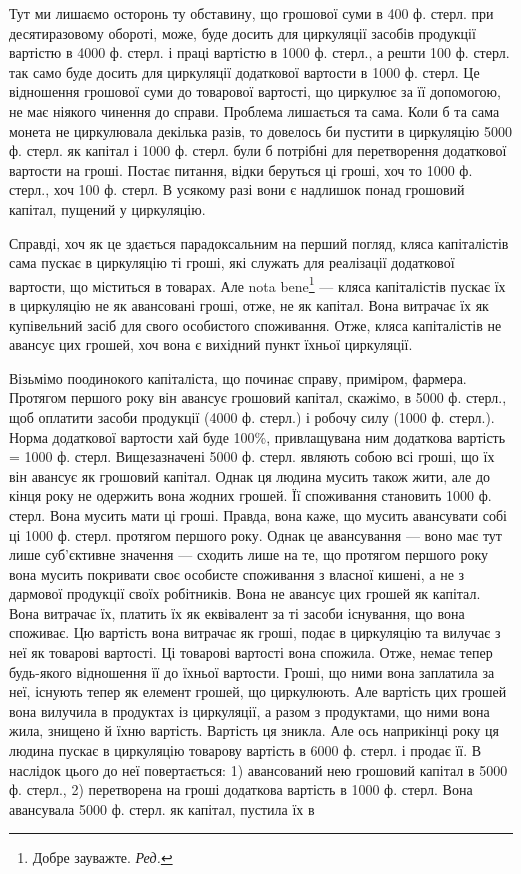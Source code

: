 Тут ми лишаємо осторонь ту обставину, що грошової суми в 400
ф. стерл. при десятиразовому обороті, може, буде досить для циркуляції
засобів продукції вартістю в 4000 ф. стерл. і праці вартістю в 1000 ф.
стерл., а решти 100 ф. стерл. так само буде досить для циркуляції додаткової
вартости в 1000 ф. стерл. Це відношення грошової суми до товарової
вартості, що циркулює за її допомогою, не має ніякого чинення до
справи. Проблема лишається та сама. Коли б та сама монета не циркулювала
декілька разів, то довелось би пустити в циркуляцію 5000 ф. стерл.
як капітал і 1000 ф. стерл. були б потрібні для перетворення додаткової
вартости на гроші. Постає питання, відки беруться ці гроші, хоч то
1000 ф. стерл., хоч 100 ф. стерл. В усякому разі вони є надлишок понад
грошовий капітал, пущений у циркуляцію.

Справді, хоч як це здається парадоксальним на перший погляд, кляса
капіталістів сама пускає в циркуляцію ті гроші, які служать для реалізації
додаткової вартости, що міститься в товарах. Але nota bene\footnote*{
Добре зауважте. \emph{Ред.}
} — кляса
капіталістів пускає їх в циркуляцію не як авансовані гроші, отже, не як
капітал. Вона витрачає їх як купівельний засіб для свого особистого
споживання. Отже, кляса капіталістів не авансує цих грошей, хоч вона
є вихідний пункт їхньої циркуляції.

Візьмімо поодинокого капіталіста, що починає справу, приміром,
фармера. Протягом першого року він авансує грошовий капітал, скажімо,
в 5000 ф. стерл., щоб оплатити засоби продукції (4000 ф. стерл.) і робочу
силу (1000 ф. стерл.). Норма додаткової вартости хай буде 100\%, привлащувана
ним додаткова вартість = 1000 ф. стерл. Вищезазначені 5000 ф.
стерл. являють собою всі гроші, що їх він авансує як грошовий капітал.
Однак ця людина мусить також жити, але до кінця року не одержить
вона жодних грошей. Її споживання становить 1000 ф. стерл. Вона мусить
мати ці гроші. Правда, вона каже, що мусить авансувати собі ці 1000 ф. стерл.
протягом першого року. Однак це авансування — воно має тут лише
суб’єктивне значення — сходить лише на те, що протягом першого року
вона мусить покривати своє особисте споживання з власної кишені, а не
з дармової продукції своїх робітників. Вона не авансує цих грошей як
капітал. Вона витрачає їх, платить їх як еквівалент за ті засоби існування,
що вона споживає. Цю вартість вона витрачає як гроші, подає в
циркуляцію та вилучає з неї як товарові вартості. Ці товарові вартості
вона спожила. Отже, немає тепер будь-якого відношення її до їхньої
вартости. Гроші, що ними вона заплатила за неї, існують тепер як елемент
грошей, що циркулюють. Але вартість цих грошей вона вилучила
в продуктах із циркуляції, а разом з продуктами, що ними вона жила,
знищено й їхню вартість. Вартість ця зникла. Але ось наприкінці року
ця людина пускає в циркуляцію товарову вартість в 6000 ф. стерл. і продає її.
В наслідок цього до неї повертається: 1) авансований нею грошовий
капітал в 5000 ф. стерл., 2) перетворена на гроші додаткова вартість в
1000 ф. стерл. Вона авансувала 5000 ф. стерл. як капітал, пустила їх в
\parbreak{}  %
